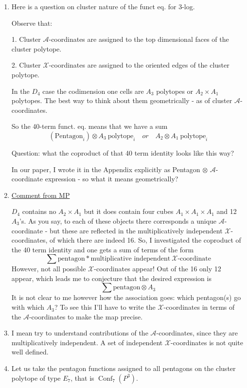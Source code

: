 \documentclass[12pt]{article}
\DeclareMathOperator{\Conf}{Conf}
\begin{document}
\begin{enumerate}
\item Here is a question on cluster nature of the funct eq. for 3-log.

Observe that: 

1. Cluster $\mathcal{A}$-coordinates are assigned to the top dimensional faces of the cluster polytope. 

2. Cluster $\mathcal{X}$-coordinates are assigned to the oriented edges of the cluster polytope. 

In the $D_4$ case the codimension one cells are $A_3$ polytopes or $A_2 \times A_1$ polytopes. 
The best way to think about them geometrically - as of cluster $\mathcal{A}$-coordinates.

So the 40-term funct. eq. means that we have a sum 
$$
(\text{Pentagon}_i) \otimes A_3~\text{polytope}_i
\quad or \quad A_2 \otimes A_1~\text{polytope}_i
$$

Question: what the coproduct of that 40 term identity looks like this way? 

In our paper, I wrote it in the Appendix explicitly as 
Pentagon $\otimes$ $\mathcal{A}$-coordinate expression - so
what it means geometrically? 

\item \underline{Comment from MP}

$D_4$ contains no $A_2\times A_1$ but it does contain four cubes $A_1 \times A_1 \times A_1$ and 12 $A_3$'s. As you say, to each of these objects there corresponds a unique $\mathcal{A}$-coordinate - but these are reflected in the multiplicatively independent $\mathcal{X}$-coordinates, of which there are indeed 16. So, I investigated the coproduct of the 40 term identity and one gets a sum of terms of the form
$$
\sum \text{pentagon} * \text{multiplicative~independent}~\mathcal{X}\text{-coordinate}
$$
However, not all possible $\mathcal{X}$-coordinates appear! Out of the 16 only 12 appear, which leads me to conjecture that the desired expression is
$$
\sum \text{pentagon} \otimes A_3
$$
It is not clear to me however how the association goes: which pentagon(s) go with which $A_3$? To see this I'll have to write the $\mathcal{X}$-coordinates in terms of the $\mathcal{A}$-coordinates to make the map precise.

\item I mean try to understand contributions of the ${\mathcal{A}}$-coordinates, since they are multiplicatively independent. A set of independent $\mathcal{X}$-coordinates is not quite well defined.

\item Let us take the pentagon functions assigned to all pentagons on
the cluster polytope of type $E_7$, that is $\Conf_7(P^3)$.


\end{enumerate}
\end{document}
